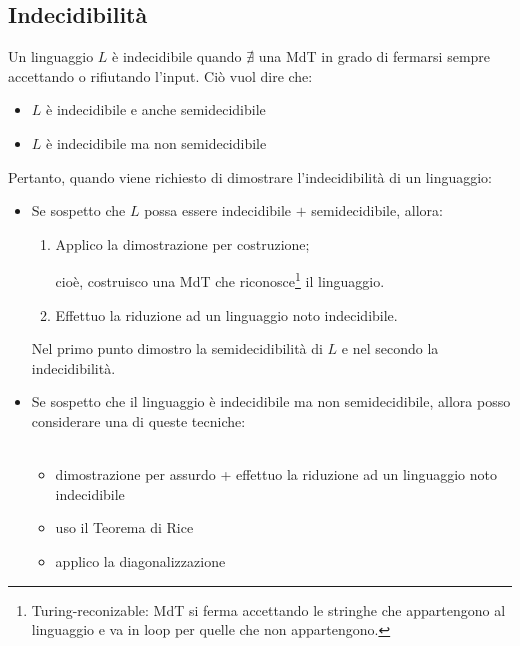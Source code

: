 \documentclass{article}  %
\theoremstyle{definition}
\begin{document}
\subsection{Indecidibilità}
Un linguaggio $L$ è indecidibile quando $\nexists$ una MdT in grado di fermarsi sempre accettando o rifiutando l'input. Ciò vuol dire che:
\begin{itemize}
  \item $L$ è indecidibile e anche semidecidibile
  \item $L$ è indecidibile ma non semidecidibile
\end{itemize}
Pertanto, quando viene richiesto di dimostrare l'indecidibilità di un linguaggio:
\begin{itemize}
  \item Se sospetto che $L$ possa essere indecidibile $+$ semidecidibile, allora:
  \begin{enumerate}
    \item Applico la dimostrazione per costruzione; 
   
  cioè, costruisco una MdT che riconosce\footnote{Turing-reconizable: MdT si ferma accettando le stringhe che appartengono al linguaggio e va in loop
  per quelle che non appartengono.} il linguaggio. 
   \item Effettuo la riduzione ad un linguaggio noto indecidibile. 
  \end{enumerate}
  Nel primo punto dimostro la semidecidibilità di $L$ e nel secondo la indecidibilità.
  \item Se sospetto che il linguaggio è indecidibile ma non semidecidibile, allora posso considerare una di queste tecniche: \\ \\
  \newline \newline
  \begin{itemize}
    \item dimostrazione per assurdo + effettuo la riduzione ad un linguaggio noto indecidibile
    \item uso il Teorema di Rice
    \item applico la diagonalizzazione
  \end{itemize}
\end{itemize}
\end{document}

